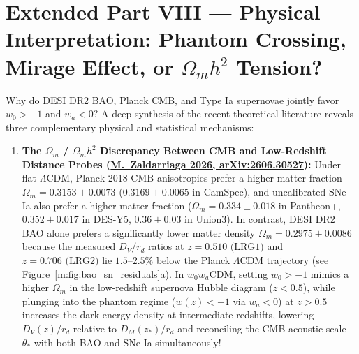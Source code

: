 \documentclass[aps,prd,preprint,superscriptaddress,nofootinbib]{revtex4-2}
\begin{document}
\section{Extended Part VIII --- Physical Interpretation: Phantom Crossing, Mirage Effect, or $\Omega_m h^2$ Tension?}

Why do DESI DR2 BAO, Planck CMB, and Type Ia supernovae jointly favor $w_0 > -1$ and $w_a < 0$? A deep synthesis of the recent theoretical literature reveals three complementary physical and statistical mechanisms:

\begin{enumerate}
    \setlength{\itemsep}{4pt}
    \item \textbf{The $\Omega_m$ / $\Omega_m h^2$ Discrepancy Between CMB and Low-Redshift Distance Probes (\href{https://arxiv.org/abs/2606.30527}{M.\ Zaldarriaga 2026, arXiv:2606.30527}):} Under flat $\Lambda$CDM, Planck 2018 CMB anisotropies prefer a higher matter fraction $\Omega_m = 0.3153 \pm 0.0073$ ($0.3169 \pm 0.0065$ in CamSpec), and uncalibrated SNe Ia also prefer a higher matter fraction ($\Omega_m = 0.334 \pm 0.018$ in Pantheon+, $0.352 \pm 0.017$ in DES-Y5, $0.36 \pm 0.03$ in Union3). In contrast, DESI DR2 BAO alone prefers a significantly lower matter density $\Omega_m = 0.2975 \pm 0.0086$ because the measured $D_V/r_d$ ratios at $z = 0.510\text{ (LRG1)}$ and $z = 0.706\text{ (LRG2)}$ lie $1.5\text{--}2.5\%$ below the Planck $\Lambda$CDM trajectory (see Figure~\ref{m:fig:bao_sn_residuals}a). In $w_0 w_a$CDM, setting $w_0 > -1$ mimics a higher $\Omega_m$ in the low-redshift supernova Hubble diagram ($z < 0.5$), while plunging into the phantom regime ($w(z) < -1$ via $w_a < 0$) at $z > 0.5$ increases the dark energy density at intermediate redshifts, lowering $D_V(z)/r_d$ relative to $D_M(z_*)/r_d$ and reconciling the CMB acoustic scale $\theta_*$ with both BAO and SNe Ia simultaneously!

\end{enumerate}
\end{document}
